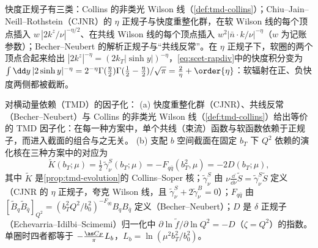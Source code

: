 快度正规子有三类：Collins 的非类光 Wilson 线（\cref{def:tmd-collins}）；Chiu--Jain--Neill--Rothstein（CJNR）的 $\eta$ 正规子与快度重整化群\cite{ChiuEtAl2012a,ChiuEtAl2012b}，在软 Wilson 线的每个顶点插入 $w\,|2k^z/\nu|^{-\eta/2}$、在共线 Wilson 线的每个顶点插入 $w^2|\bar n\cdot k/\nu|^{-\eta}$（$w$ 为记账参数）；Becher--Neubert 的解析正规子与“共线反常”\cite{BecherNeubert2011}。在 $\eta$ 正规子下，软圈的两个顶点合起来给出 $|2k^z|^{-\eta}=(2k_T|\sinh y|)^{-\eta}$，\cref{eq:scet-rapdiv}中的快度积分变为 $\int\dd y\,|2\sinh y|^{-\eta}=2^{-\eta}\Gamma(\tfrac\eta2)\Gamma(\tfrac12-\tfrac\eta2)/\sqrt\pi=\tfrac2\eta+\order{\eta}$：软辐射在正、负快度两侧都被截断。%

\begin{proposition}\label{prop:scet-rapidity-rg}
对横动量依赖（TMD）的因子化：
(a) 快度重整化群（CJNR）、共线反常（Becher--Neubert）与 Collins 的非类光 Wilson 线（\cref{def:tmd-collins}）给出等价的 TMD 因子化\cite{Collins:2017oxh}：在每一种方案中，单个共线（束流）函数与软函数依赖于正规子，而进入截面的组合与之无关。
(b) 支配 $b$ 空间截面在固定 $b_T$ 下 $Q^2$ 依赖的演化核在三种方案中的对应为
\begin{equation}\label{eq:scet-kernels}
\tilde K(b_T;\mu)=\tfrac12\,\tilde\gamma_\nu^S(b_T;\mu)=-F_{q\bar q}(b_T^2,\mu)=-2D(b_T;\mu),
\end{equation}
其中 $\tilde K$ 是\cref{prop:tmd-evolution}的 Collins--Soper 核；$\tilde\gamma_\nu^S$ 由 $\nu\frac{\dd}{\dd\nu}\tilde S=\tilde\gamma^S_\nu\tilde S$ 定义（CJNR 的 $\eta$ 正规子，夸克 Wilson 线，且 $\tilde\gamma^S_\nu+2\tilde\gamma^B_\nu=0$）；$F_{q\bar q}$ 由 $[\tilde B_{q}\tilde B_{\bar q}]_{Q^2}=(b_T^2Q^2/b_0^2)^{-F_{q\bar q}}B_qB_{\bar q}$ 定义（Becher--Neubert）；$D$ 是 $\delta$ 正规子（Echevarria--Idilbi--Scimemi）归一化中 $\partial\ln\tilde f/\partial\ln Q^2=-D$（$\zeta=Q^2$）的指数\cite{EchevarriaIdilbiScimemi2012}。单圈时四者都等于 $-\frac{\as C_F}{\pi}L_b$，$L_b=\ln(\mu^2b_T^2/b_0^2)$。
\end{proposition}

